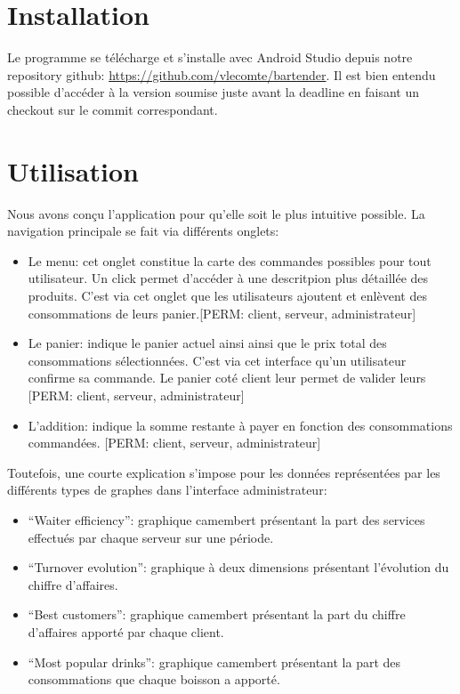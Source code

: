 \documentclass[a4paper,10pt]{article}
\begin{document}

\section{Installation}

Le programme se télécharge et s'installe avec Android Studio depuis notre repository github:
\url{https://github.com/vlecomte/bartender}.
Il est bien entendu possible d'accéder à la version soumise juste avant la deadline en faisant un checkout sur le commit correspondant.

\section{Utilisation}

Nous avons conçu l'application pour qu'elle soit le plus intuitive possible. La navigation principale se fait via différents onglets:
\begin{itemize}
    \item{Le menu: cet onglet constitue la carte des commandes possibles pour tout utilisateur. Un click permet d'accéder à une descritpion plus détaillée des produits. C'est via cet onglet que les utilisateurs ajoutent et enlèvent des consommations de leurs panier.[PERM: client, serveur, administrateur]}
    	\item{Le panier: indique le panier actuel ainsi ainsi que le prix total des consommations sélectionnées. C'est via cet interface qu'un utilisateur confirme sa commande. Le panier coté client leur permet de valider leurs [PERM: client, serveur, administrateur]}
    	\item{L'addition: indique la somme restante à payer en fonction des consommations commandées. [PERM: client, serveur, administrateur]}
    	
\end{itemize}
Toutefois, une courte explication s'impose pour les données représentées par les différents types de graphes dans l'interface administrateur:
\begin{itemize}
    \item ``Waiter efficiency'': graphique camembert présentant la part des services effectués par chaque serveur sur une période.
    \item ``Turnover evolution'': graphique à deux dimensions présentant l'évolution du chiffre d'affaires.
    \item ``Best customers'': graphique camembert présentant la part du chiffre d'affaires apporté par chaque client.
    \item ``Most popular drinks'': graphique camembert présentant la part des consommations que chaque boisson a apporté.
\end{itemize}
\end{document}
